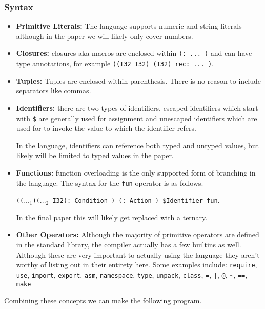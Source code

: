 \documentclass{article}
\begin{document}
\subsubsection{Syntax}
\begin{itemize}
    \item \textbf{Primitive Literals:} The language supports numeric and string literals although in the paper we will likely only cover numbers.

    \item \textbf{Closures:} closures aka macros are enclosed within \texttt{(: ... )} and can have type annotations, for example \texttt{((I32 I32) (I32) rec: ... )}.

    \item \textbf{Tuples:} Tuples are enclosed within parenthesis. There is no reason to include separators like commas.

    \item \textbf{Identifiers:} there are two types of identifiers, escaped identifiers which start with \texttt{\$} are generally used for assignment and unescaped identifiers which are used for to invoke the value to which the identifier refers.
    
    In the language, identifiers can reference both typed and untyped values, but likely will be limited to typed values in the paper.

    \item \textbf{Functions:} function overloading is the only supported form of branching in the language. The syntax for the \texttt{fun} operator is as follows. 

    \texttt{(($..._1$)($..._2$ I32): Condition ) (: Action ) \$Identifier fun}.

    In the final paper this will likely get replaced with a ternary.

    \item \textbf{Other Operators:} Although the majority of primitive operators are defined in the standard library, the compiler actually has a few builtins as well. Although these are very important to actually using the language they aren't worthy of listing out in their entirety here. Some examples include: \texttt{require}, \texttt{use}, \texttt{import}, \texttt{export}, \texttt{asm}, \texttt{namespace}, \texttt{type}, \texttt{unpack}, \texttt{class}, \texttt{=}, \texttt{|}, \texttt{@}, \texttt{\~}, \texttt{==}, \texttt{make}
\end{itemize}
    
    Combining these concepts we can make the following program.
    
\end{document}
